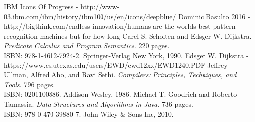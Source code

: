 \documentclass{article}
\begin{document}
\begin{thebibliography}{99}

 IBM Icons Of Progress - http://www-03.ibm.com/ibm/history/ibm100/us/en/icons/deepblue/
 Dominic Basulto 2016 - http://bigthink.com/endless-innovation/humans-are-the-worlds-best-pattern-recognition-machines-but-for-how-long
 Carel S. Scholten and Edsger W. Dijkstra. \emph{Predicate Calculus and Program Semantics}. 220 pages. \\ISBN: 978-1-4612-7924-2. Springer-Verlag New York, 1990.
 Edsger W. Dijkstra - https://www.cs.utexas.edu/users/EWD/ewd12xx/EWD1240.PDF
 Jeffrey Ullman, Alfred Aho, and Ravi Sethi. \emph{Compilers: Principles, Techniques, and Tools}. 796 pages. \\ISBN: 0201100886. Addison Wesley, 1986.
 Michael T. Goodrich and Roberto Tamassia. \emph{Data Structures and Algorithms in Java}. 736 pages. \\ISBN: 978-0-470-39880-7. John Wiley \& Sons Inc, 2010.
\end{thebibliography}
\end{document}
